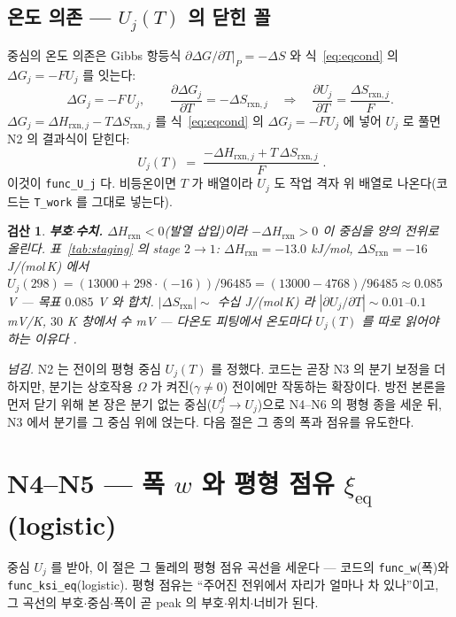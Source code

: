 \documentclass[11pt,a4paper]{article}
\newtheorem*{verifybox}{검산}
\newcommand{\eq}{\mathrm{eq}}
\newcommand{\rxn}{\mathrm{rxn}}
\newcommand{\code}[1]{\texttt{#1}}
\begin{document}
\subsection{온도 의존 — $U_j(T)$ 의 닫힌 꼴}
중심의 온도 의존은 Gibbs 항등식 $\partial\Delta G/\partial T|_P=-\Delta S$ 와 식~\eqref{eq:eqcond} 의 $\Delta G_j=-FU_j$ 를 잇는다:
\begin{equation}
\Delta G_j=-F\,U_j,\qquad
\frac{\partial\Delta G_j}{\partial T}=-\Delta S_{\rxn,j}
\quad\Longrightarrow\quad
\frac{\partial U_j}{\partial T}=\frac{\Delta S_{\rxn,j}}{F}.
\label{eq:dUdT}
\end{equation}
$\Delta G_j=\Delta H_{\rxn,j}-T\Delta S_{\rxn,j}$ 를 식~\eqref{eq:eqcond} 의 $\Delta G_j=-FU_j$ 에 넣어 $U_j$ 로 풀면 N2 의 결과식이 닫힌다:
\begin{equation}
\boxed{\;U_j(T)\;=\;\frac{-\Delta H_{\rxn,j}+T\,\Delta S_{\rxn,j}}{F}\;.}
\label{eq:Uj}
\end{equation}
이것이 \code{func\_U\_j} 다. 비등온이면 $T$ 가 배열이라 $U_j$ 도 작업 격자 위 배열로 나온다(코드는 \code{T\_work} 를 그대로 넣는다).

\begin{verifybox}
\textbf{부호$\cdot$수치.} $\Delta H_\rxn<0$(발열 삽입)이라 $-\Delta H_\rxn>0$ 이 중심을 양의 전위로 올린다. 표~\ref{tab:staging} 의 stage $2\!\to\!1$: $\Delta H_\rxn=-13.0$ kJ/mol, $\Delta S_\rxn=-16$ J/(mol\,K) 에서 $U_j(298)=(13000+298\cdot(-16))/96485=(13000-4768)/96485\approx0.085$ V — 목표 $0.085$ V 와 합치. $|\Delta S_\rxn|\sim$ 수십 J/(mol\,K) 라 $|\partial U_j/\partial T|\sim0.01$--$0.1$ mV/K, $30$ K 창에서 수 mV — 다온도 피팅에서 온도마다 $U_j(T)$ 를 따로 읽어야 하는 이유다 \cite{reynier2004}.
\end{verifybox}

\medskip
\emph{넘김.} N2 는 전이의 평형 중심 $U_j(T)$ 를 정했다. 코드는 곧장 N3 의 분기 보정을 더하지만, 분기는 상호작용 $\Omega$ 가 켜진($\gamma\ne0$) 전이에만 작동하는 확장이다. 방전 본론을 먼저 닫기 위해 본 장은 분기 없는 중심($U_j^d\to U_j$)으로 N4--N6 의 평형 종을 세운 뒤, N3 에서 분기를 그 중심 위에 얹는다. 다음 절은 그 종의 폭과 점유를 유도한다.

\section{N4--N5 — 폭 $w$ 와 평형 점유 $\xi_\eq$ (logistic)}\label{sec:width}\label{sec:logistic}
중심 $U_j$ 를 받아, 이 절은 그 둘레의 평형 점유 곡선을 세운다 — 코드의 \code{func\_w}(폭)와 \code{func\_ksi\_eq}(logistic). 평형 점유는 ``주어진 전위에서 자리가 얼마나 차 있나''이고, 그 곡선의 부호$\cdot$중심$\cdot$폭이 곧 peak 의 부호$\cdot$위치$\cdot$너비가 된다.
\end{document}
